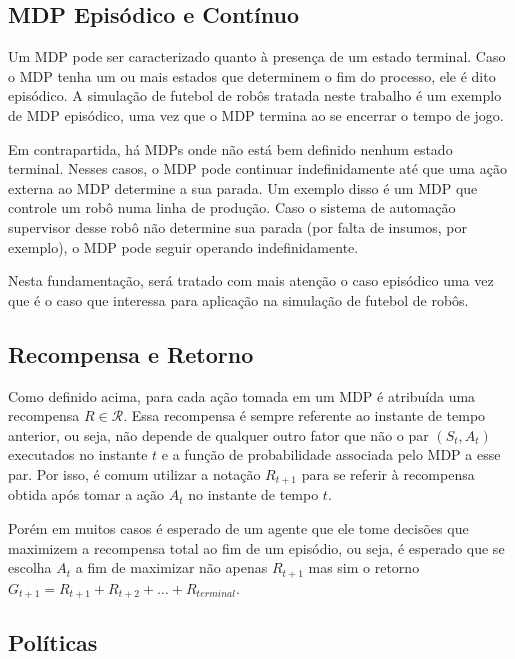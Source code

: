 \subsection{MDP Episódico e Contínuo}

Um MDP pode ser caracterizado quanto à presença de um estado terminal. Caso o MDP tenha um ou mais estados que determinem o fim do processo, ele é dito episódico. A simulação de futebol de robôs tratada neste trabalho é um exemplo de MDP episódico, uma vez que o MDP termina ao se encerrar o tempo de jogo.

Em contrapartida, há MDPs onde não está bem definido nenhum estado terminal. Nesses casos, o MDP pode continuar indefinidamente até que uma ação externa ao MDP determine a sua parada. Um exemplo disso é um MDP que controle um robô numa linha de produção. Caso o sistema de automação supervisor desse robô não determine sua parada (por falta de insumos, por exemplo), o MDP pode seguir operando indefinidamente.

Nesta fundamentação, será tratado com mais atenção o caso episódico uma vez que é o caso que interessa para aplicação na simulação de futebol de robôs.

\subsection{Recompensa e Retorno}

Como definido acima, para cada ação tomada em um MDP é atribuída uma recompensa $R \in \mathcal{R}$. Essa recompensa é sempre referente ao instante de tempo anterior, ou seja, não depende de qualquer outro fator que não o par $(S_t, A_t)$ executados no instante $t$ e a função de probabilidade associada pelo MDP a esse par. Por isso, é comum utilizar a notação $R_{t+1}$ para se referir à recompensa obtida após tomar a ação $A_t$ no instante de tempo $t$.

Porém em muitos casos é esperado de um agente que ele tome decisões que maximizem a recompensa total ao fim de um episódio, ou seja, é esperado que se escolha $A_t$ a fim de maximizar não apenas $R_{t+1}$ mas sim o retorno $G_{t+1} = R_{t+1} + R_{t+2} + \dotsc + R_{terminal}$.


\subsection{Políticas}

